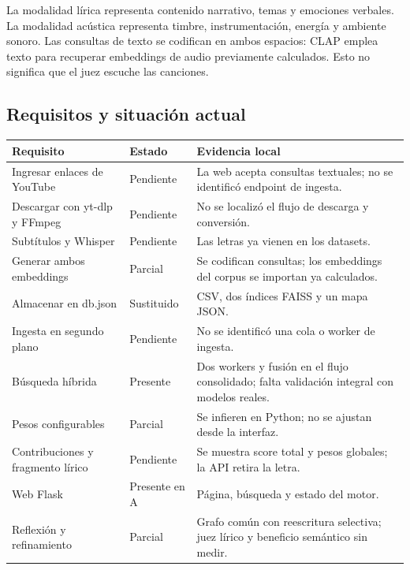 \documentclass[11pt,a4paper]{article}
\begin{document}
La modalidad lírica representa contenido narrativo, temas y emociones verbales. La modalidad acústica representa timbre, instrumentación, energía y ambiente sonoro. Las consultas de texto se codifican en ambos espacios: CLAP emplea texto para recuperar embeddings de audio previamente calculados. Esto no significa que el juez escuche las canciones.

\subsection{Requisitos y situación actual}
\small
\begin{longtable}{p{}p{}p{}}
\toprule Requisito & Estado & Evidencia local\\\midrule\endhead
Ingresar enlaces de YouTube & Pendiente & La web acepta consultas textuales; no se identificó endpoint de ingesta.\\
Descargar con yt-dlp y FFmpeg & Pendiente & No se localizó el flujo de descarga y conversión.\\
Subtítulos y Whisper & Pendiente & Las letras ya vienen en los datasets.\\
Generar ambos embeddings & Parcial & Se codifican consultas; los embeddings del corpus se importan ya calculados.\\
Almacenar en db.json & Sustituido & CSV, dos índices FAISS y un mapa JSON.\\
Ingesta en segundo plano & Pendiente & No se identificó una cola o worker de ingesta.\\
Búsqueda híbrida & Presente & Dos workers y fusión en el flujo consolidado; falta validación integral con modelos reales.\\
Pesos configurables & Parcial & Se infieren en Python; no se ajustan desde la interfaz.\\
Contribuciones y fragmento lírico & Pendiente & Se muestra score total y pesos globales; la API retira la letra.\\
Web Flask & Presente en A & Página, búsqueda y estado del motor.\\
Reflexión y refinamiento & Parcial & Grafo común con reescritura selectiva; juez lírico y beneficio semántico sin medir.\\
\bottomrule
\end{longtable}
\normalsize
\end{document}
